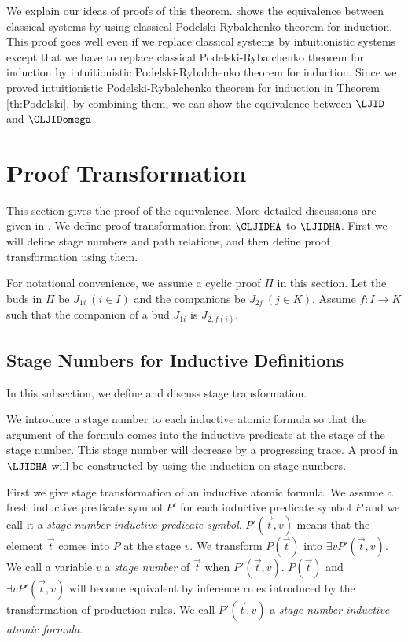 We explain our ideas of proofs of this theorem.
\cite{Berardi17a} shows the equivalence between classical systems
by using classical Podelski-Rybalchenko theorem for induction.
This proof goes well even if we replace classical systems by intuitionistic
systems except that
we have to replace classical Podelski-Rybalchenko theorem for induction
by intuitionistic Podelski-Rybalchenko theorem for induction.
Since we proved intuitionistic Podelski-Rybalchenko theorem for induction
in Theorem \ref{th:Podelski},
by combining them, we can show the equivalence between
$\LJID$ and $\CLJIDomega$.

\section{Proof Transformation}

This section gives the proof of the equivalence.
More detailed discussions are given in \cite{Berardi17b}.
We define proof transformation from $\CLJIDHA$ to $\LJIDHA$.
First we will define stage numbers and path relations,
and then define proof transformation using them.

For notational convenience,
we assume a cyclic proof $\Pi$ in this section.
Let the buds in $\Pi$ be $J_{1i} \ (i \in I)$ and
the companions be $J_{2j} \ (j \in K)$.
Assume $f:I \to K$ such that the companion of a bud $J_{1i}$ is $J_{2,f(i)}$.

\subsection{Stage Numbers for Inductive Definitions}

In this subsection, we define and discuss stage transformation.

We introduce a stage number to each inductive atomic formula 
so that
the argument of the formula comes into the inductive predicate at the stage 
of the stage number.
This stage number will decrease by a progressing trace.
A proof in $\LJIDHA$ will be constructed by 
using the induction on stage numbers.

First we give stage transformation of an inductive atomic formula.
We assume a fresh inductive predicate symbol $P'$ for
each inductive predicate symbol $P$
and we call it a {\em stage-number inductive predicate symbol}.
$P'(\Vec t,v)$ means that
the element $\Vec t$ comes into $P$ at the stage $v$.
We transform $P(\Vec t)$ into $\exists vP'(\Vec t,v)$.
We call a variable $v$ a {\em stage number}
of $\Vec t$ when $P'(\Vec t,v)$.
$P(\Vec t)$ and $\exists vP'(\Vec t,v)$ will become equivalent 
by inference rules introduced by the transformation of production rules.
We call $P'(\Vec t,v)$ a {\em stage-number inductive atomic formula}.

